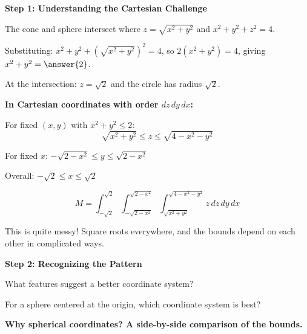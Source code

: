 \documentclass{ximera}
\begin{document}
\begin{problem}
\begin{center}
\end{center}

\textbf{Step 1: Understanding the Cartesian Challenge}

The cone and sphere intersect where $z = \sqrt{x^2+y^2}$ and $x^2+y^2+z^2=4$.

Substituting: $x^2+y^2+(\sqrt{x^2+y^2})^2 = 4$, so $2(x^2+y^2) = 4$, giving $x^2+y^2 = \answer{2}$.

At the intersection: $z = \sqrt{2}$ and the circle has radius $\sqrt{2}$.

\textbf{In Cartesian coordinates with order $dz\,dy\,dx$:}

For fixed $(x,y)$ with $x^2+y^2 \leq 2$:
$$\sqrt{x^2+y^2} \leq z \leq \sqrt{4-x^2-y^2}$$

For fixed $x$: $-\sqrt{2-x^2} \leq y \leq \sqrt{2-x^2}$

Overall: $-\sqrt{2} \leq x \leq \sqrt{2}$

$$M = \int_{-\sqrt{2}}^{\sqrt{2}} \int_{-\sqrt{2-x^2}}^{\sqrt{2-x^2}} \int_{\sqrt{x^2+y^2}}^{\sqrt{4-x^2-y^2}} z\,dz\,dy\,dx$$

This is quite messy! Square roots everywhere, and the bounds depend on each other in complicated ways.

\textbf{Step 2: Recognizing the Pattern}

What features suggest a better coordinate system?
\begin{selectAll}
\end{selectAll}

For a sphere centered at the origin, which coordinate system is best?
\begin{multipleChoice}
\end{multipleChoice}

\textbf{Why spherical coordinates?  A side-by-side comparison of the bounds.}

\begin{center}
\begin{tikzpicture}[scale=1.0]


\end{tikzpicture}
\end{center}
\end{problem}
\end{document}
